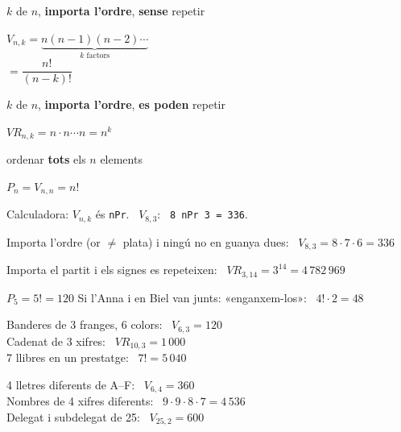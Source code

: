 \documentclass[11pt,a4paper]{article}
\newcommand{\comic}{\fontfamily{ComicNeue-TLF}\selectfont}
\begin{document}
\vfill
\begin{tcbraster}[raster columns=3,raster equal height,raster column skip=8pt]
\begin{tcolorbox}[fmbase,colback=fmA!8,colframe=fmA,coltitle=white,title={Variacions},before upper=\centering]
\small $k$ de $n$, \textbf{importa l'ordre}, \textbf{sense} repetir\par\smallskip
\normalsize$V_{n,k}=\underbrace{n(n-1)(n-2)\cdots}_{k\text{ factors}}$\\[2pt] $=\dfrac{n!}{(n-k)!}$
\end{tcolorbox}
\begin{tcolorbox}[fmbase,colback=fmB!8,colframe=fmB,coltitle=white,title={Amb repetició},before upper=\centering]
\small $k$ de $n$, \textbf{importa l'ordre}, \textbf{es poden} repetir\par\smallskip
\normalsize$VR_{n,k}=n\cdot n\cdots n=n^k$
\end{tcolorbox}
\begin{tcolorbox}[fmbase,colback=fmK!8,colframe=fmK,coltitle=white,title={Permutacions},before upper=\centering]
\small ordenar \textbf{tots} els $n$ elements\par\smallskip
\normalsize$P_n=V_{n,n}=n!$
\end{tcolorbox}
\end{tcbraster}
{\comic\color{fmmuted}\centering Calculadora: $V_{n,k}$ és \texttt{nPr}. \ $V_{8,3}$: \ \texttt{8 nPr 3 = 336}.\par}

\vfill
\begin{exemple}
Importa l'ordre (or $\neq$ plata) i ningú no en guanya dues: \ $V_{8,3}=8\cdot7\cdot6=\boxed{336}$
\end{exemple}

\vfill
\begin{exemple}
Importa el partit i els signes es repeteixen: \ $VR_{3,14}=3^{14}=\boxed{4\,782\,969}$
\end{exemple}

\vfill
\begin{exemple}
$P_5=5!=\boxed{120}$ \qquad Si l'Anna i en Biel van junts: «enganxem-los»: \ $4!\cdot2=\boxed{48}$
\end{exemple}

\vfill
\begin{exemple}[Exemples]
\begin{minipage}[t]{0.49\linewidth}
Banderes de 3 franges, 6 colors: \ $V_{6,3}=120$\\[3pt]
Cadenat de 3 xifres: \ $VR_{10,3}=1\,000$\\[3pt]
7 llibres en un prestatge: \ $7!=5\,040$
\end{minipage}\hfill
\begin{minipage}[t]{0.49\linewidth}
4 lletres diferents de A--F: \ $V_{6,4}=360$\\[3pt]
Nombres de 4 xifres diferents: \ $9\cdot9\cdot8\cdot7=4\,536$\\[3pt]
Delegat i subdelegat de 25: \ $V_{25,2}=600$
\end{minipage}
\end{exemple}
\end{document}
